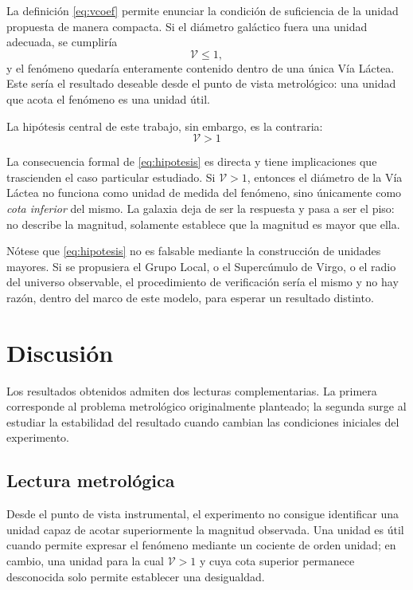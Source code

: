\documentclass[conference]{IEEEtran}
\newcommand{\Vcoef}{\mathcal{V}}
\begin{document}
La definición \eqref{eq:vcoef} permite enunciar la condición de suficiencia de
la unidad propuesta de manera compacta. Si el diámetro galáctico fuera una
unidad adecuada, se cumpliría
\begin{equation}
\Vcoef \leq 1,
\label{eq:suficiencia}
\end{equation}
y el fenómeno quedaría enteramente contenido dentro de una única Vía Láctea.
Este sería el resultado deseable desde el punto de vista metrológico: una
unidad que acota el fenómeno es una unidad útil.

La hipótesis central de este trabajo, sin embargo, es la contraria:
\begin{equation}
\boxed{\;\Vcoef > 1\;}
\label{eq:hipotesis}
\end{equation}

La consecuencia formal de \eqref{eq:hipotesis} es directa y tiene implicaciones
que trascienden el caso particular estudiado. Si $\Vcoef > 1$, entonces el
diámetro de la Vía Láctea no funciona como unidad de medida del fenómeno, sino
únicamente como \emph{cota inferior} del mismo. La galaxia deja de ser la
respuesta y pasa a ser el piso: no describe la magnitud, solamente establece
que la magnitud es mayor que ella.

Nótese que \eqref{eq:hipotesis} no es falsable mediante la construcción de
unidades mayores. Si se propusiera el Grupo Local, o el Supercúmulo de Virgo, o
el radio del universo observable, el procedimiento de verificación sería el
mismo y no hay razón, dentro del marco de este modelo, para esperar un
resultado distinto.

\section{Discusión}
\label{sec:discusion}

Los resultados obtenidos admiten dos lecturas complementarias. La primera
corresponde al problema metrológico originalmente planteado; la segunda surge
al estudiar la estabilidad del resultado cuando cambian las condiciones
iniciales del experimento.

\subsection{Lectura metrológica}

Desde el punto de vista instrumental, el experimento no consigue identificar
una unidad capaz de acotar superiormente la magnitud observada. Una unidad es
útil cuando permite expresar el fenómeno mediante un cociente de orden unidad;
en cambio, una unidad para la cual $\Vcoef>1$ y cuya cota superior permanece
desconocida solo permite establecer una desigualdad.
\end{document}
